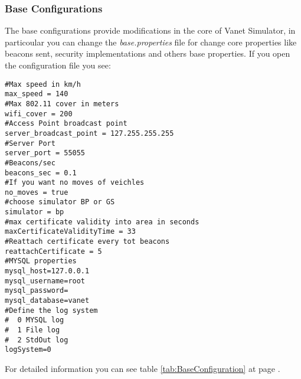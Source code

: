 \subsubsection{Base Configurations}\label{usermanual:baseconfiguration}
The base configurations provide modifications in the core of Vanet Simulator, in particoular you can change the \textit{base.properties} file for change core properties like beacons sent, security implementations and others base properties.
If you open the configuration file you see:
\begin{verbatim}
#Max speed in km/h
max_speed = 140
#Max 802.11 cover in meters
wifi_cover = 200
#Access Point broadcast point
server_broadcast_point = 127.255.255.255
#Server Port
server_port = 55055
#Beacons/sec
beacons_sec = 0.1
#If you want no moves of veichles
no_moves = true
#choose simulator BP or GS
simulator = bp
#max certificate validity into area in seconds
maxCertificateValidityTime = 33
#Reattach certificate every tot beacons
reattachCertificate = 5
#MYSQL properties
mysql_host=127.0.0.1
mysql_username=root
mysql_password=
mysql_database=vanet
#Define the log system
#  0 MYSQL log
#  1 File log
#  2 StdOut log
logSystem=0
\end{verbatim}
For detailed information you can see table \ref{tab:BaseConfiguration} at page \pageref{tab:BaseConfiguration}.
